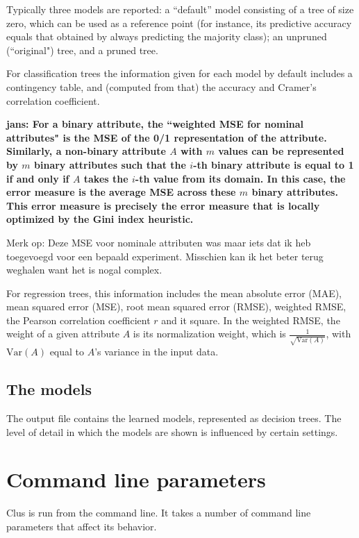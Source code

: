Typically three models are reported: a ``default'' model consisting of a tree of size zero, which can be used as a reference point (for instance, its predictive accuracy equals that obtained by always predicting the majority class); an unpruned (``original") tree, and a pruned tree.

For classification trees the information given for each model by default includes a contingency table, and (computed from that) the accuracy and Cramer's correlation coefficient.

{\bf * jans: For a binary attribute, the ``weighted MSE for nominal attributes" is the MSE of the 0/1 representation of the attribute. Similarly, a non-binary attribute $A$ with $m$ values can be represented by $m$ binary attributes such that the $i$-th binary attribute is equal to 1 if and only if $A$ takes the $i$-th value from its domain. In this case, the error measure is the average MSE across these $m$ binary attributes. This error measure is precisely the error measure that is locally optimized by the Gini index heuristic.

Merk op: Deze MSE voor nominale attributen was maar iets dat ik heb toegevoegd voor een bepaald experiment. Misschien kan ik het beter terug weghalen want het is nogal complex.}

For regression trees, this information includes the mean absolute error (MAE), mean squared error (MSE), root mean squared error (RMSE), weighted RMSE, the Pearson correlation coefficient $r$ and it square.  In the weighted RMSE, the weight of a given attribute $A$ is its normalization weight, which is $\frac{1}{\sqrt{\mathrm{Var}(A)}}$, with $\mathrm{Var}(A)$ equal to $A$'s variance in the input data. 


\section{The models}

The output file contains the learned models, represented as decision trees.  The level of detail in which the models are shown is influenced by certain settings.


\chapter{Command line parameters}
\label{param:ch}

Clus is run from the command line.  It takes a number of command line parameters that affect its behavior.

